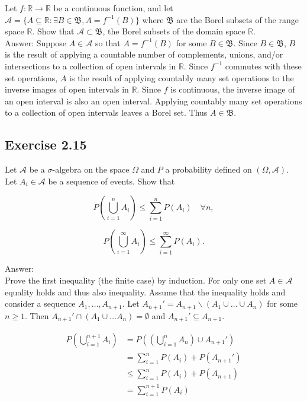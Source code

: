\documentclass{article}
\begin{document}
Let $f: \mathbb{R} \rightarrow \mathbb{R}$ be a continuous function, and let $\mathcal{A} = \{A \subseteq \mathbb{R} : \exists B \in \mathfrak{B}, A = f^{-1}(B)\}$ where $\mathfrak{B}$ are the Borel subsets of the range space $\mathbb{R}$. Show that $\mathcal{A}\subset \mathfrak{B}$, the Borel subsets of the domain space $\mathbb{R}$. \\

Answer: Suppose $A \in \mathcal{A}$ so that $A = f^{-1}(B)$ for some $B \in \mathfrak{B}$. Since $B \in \mathfrak{B}$, $B$ is the result of applying a countable number of complements, unions, and/or intersections to a collection of open intervals in $\mathbb{R}$. Since $f^{-1}$ commutes with these set operations, $A$ is the result of applying countably many set operations to the inverse images of open intervals in $\mathbb{R}$. Since $f$ is continuous, the inverse image of an open interval is also an open interval. Applying countably many set operations to a collection of open intervals leaves a Borel set. Thus $A \in \mathfrak{B}$. 

\subsection*{Exercise 2.15}

Let $\mathcal{A}$ be a $\sigma$-algebra on the space $\Omega$ and $P$ a probability defined on $(\Omega, \mathcal{A})$. Let $A_i \in \mathcal{A}$ be a sequence of events. Show that

$$
P\left(\bigcup_{i=1}^n A_i \right) \leq \sum_{i = 1}^n P(A_i) \quad \forall n,
$$

$$
P\left(\bigcup_{i=1}^\infty A_i \right) \leq \sum_{i = 1}^\infty P(A_i).
$$

Answer:\\

Prove the first inequality (the finite case) by induction. For only one set $A \in \mathcal{A}$ equality holds and thus also inequality. Assume that the inequality holds and consider a sequence $A_1, \dots , A_{n+1}$. Let $A_{n+1}' = A_{n+1} \backslash (A_1 \cup \dots \cup A_{n})$ for some $n \geq 1$. Then $A_{n+1}' \cap (A_1 \cup \dots A_n) = \emptyset$ and $A_{n+1}' \subseteq A_{n+1}$.

\begin{align*}
P\left(\bigcup_{i=1}^{n+1} A_i \right)
&= P\left(\left(\bigcup_{i=1}^n A_n \right) \cup A_{n+1}' \right) \\
&= \sum_{i = 1}^n P(A_i) + P(A_{n+1}') \\
&\leq \sum_{i = 1}^n P(A_i) + P(A_{n+1}) \\
&= \sum_{i = 1}^{n+1} P(A_i)
\end{align*}
\end{document}
